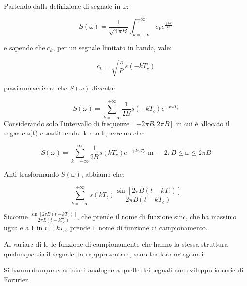 Partendo dalla definizione di segnale in $\omega$: 

{
    \Large 
    \begin{equation}
        S(\omega) 
        = 
        \frac{1}{\sqrt{4\pi B}} 
        \int_{k = -\infty}^{+ \infty} 
        c_k e^{\frac{\jmath k \omega}{2B}}
    \end{equation}
}

e sapendo che $c_k$, per un segnale limitato in banda, vale: 

{
    \Large 
    \begin{equation}
        c_k = \sqrt{\frac{\pi}{B}} s(-k T_c)
    \end{equation}
}

possiamo scrivere che $S(\omega)$ diventa: 

{
    \Large 
    \begin{equation}
        S(\omega) 
        = 
        \sum_{k = -\infty}^{+ \infty}
        \frac{1}{2B}
        s(-k T_c) e^{\jmath k \omega T_c}
    \end{equation}
}
Considerando solo l'intervallo di frequenze $[-2 \pi B, 2 \pi B]$ in cui è allocato il 
segnale s(t) e sostituendo -k con k, avremo che: 

{
    \Large 
    \begin{equation}
        S(\omega) 
        = 
        \sum_{k = -\infty}^{\infty} 
        \frac{1}{2B}
        s(kT_c) e^{-\jmath k \omega T_c}
        \text{ in } 
        -2\pi B \leq \omega \leq 2\pi B
    \end{equation}
}

Anti-trasformando $S(\omega)$, abbiamo che: 

{
    \Large 
    \begin{equation}
        \sum_{k = - \infty}^{+\infty} 
        s(kT_c) \frac{\sin[2\pi B(t-kT_c)]}{2 \pi B(t - kT_c)}
    \end{equation}
}

Siccome $\frac{\sin[2\pi B(t-kT_c)]}{2 \pi B(t - kT_c)}$, che prende il nome di funzione sinc, 
che ha massimo uguale a 1 in $t=kT_c$, prende il nome di funzione di campionamento. \newline 

Al variare di k, le funzione di campionamento che hanno la stessa struttura qualunque sia il segnale da rapppresentare, 
sono tra loro ortogonali. \newline 

Si hanno dunque condizioni analoghe a quelle dei segnali con sviluppo in serie di Forurier.\newline 

